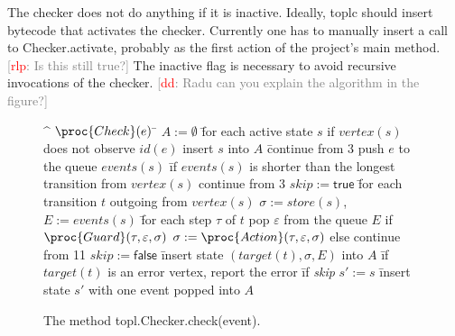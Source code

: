 \documentclass[10pt, preprint]{sigplanconf} %
\newcommand{\noterg}[2]{\textcolor{gray}{[\textcolor{red}{#1}: #2]}}
\newcommand{\rlp}[1]{\noterg{rlp}{#1}}
\newcommand{\dd}[1]{\noterg{dd}{#1}}
\begin{document}
The checker does not do anything if it is inactive.
Ideally, \textsf{toplc} should insert bytecode that activates the checker.
Currently one has to manually insert a call to
\textsf{Checker.activate}, probably as the first action of the
project's \textsf{main} method.\rlp{Is this still true?}
The inactive flag is necessary to avoid recursive invocations of the checker.
\dd{Radu can you explain the algorithm in the figure?}
\begin{figure}[htbp]
\begin{center}
\begin{alg}
\^  $\proc{Check}(e)$
\=  $A := \emptyset$
\=  for each active state $s$
\+    if $\mathit{vertex}(s)$ does not observe $\mathit{id}(e)$
\+      insert $s$ into $A$
\=      continue from $3$
\-    push $e$ to the queue $\mathit{events}(s)$
\=    if $\mathit{events}(s)$ is shorter than the longest transition from $\mathit{vertex}(s)$
\+      continue from $3$
\1    $\mathit{skip}:=\mathsf{true}$
\=    for each transition $t$ outgoing from $\mathit{vertex}(s)$
\+      $\sigma := \mathit{store}(s)$,\quad $E := \mathit{events}(s)$
\=      for each step $\tau$ of $t$
\+        pop $\varepsilon$ from the queue $E$
\+        if $\proc{Guard}(\tau, \varepsilon, \sigma)$
\+          $\sigma := \proc{Action}(\tau, \varepsilon, \sigma)$
\-        else
\+          continue from 11
\2      $\mathit{skip}:=\mathsf{false}$
\=      insert state $(\mathit{target}(t), \sigma, E)$ into $A$
\=      if $\mathit{target}(t)$ is an error vertex, report the error
\=      if \textit{skip}
\+        $s' := s$
\=        insert state $s'$ with one event popped into $A$
\end{alg}
\caption{The method \textsf{topl.Checker.check(event)}.}
\label{checker.check}
\end{center}
\end{figure}

\end{document}
